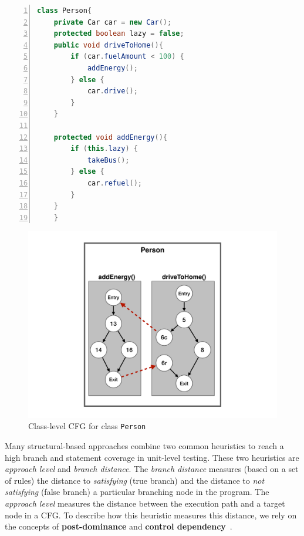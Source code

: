 \begin{lstlisting}[frame=tb,
    caption={Class \texttt{Person}},
    label=list:ClassA,
    language=java,
    captionpos=t,
    numbers=left,
    belowskip=-2.5em,
    float=t,
    firstnumber=1]
class Person{
    private Car car = new Car();
    protected boolean lazy = false;
    public void driveToHome(){
        if (car.fuelAmount < 100) {
            addEnergy();
        } else {
            car.drive();
        }   
    }

    protected void addEnergy(){
        if (this.lazy) {
            takeBus();
        } else {
            car.refuel();
        }
    }   
    }
  \end{lstlisting}

  \begin{figure}[t]
    \centering
	\includegraphics[width=0.85\linewidth]{figs/CCFG_new}
	\caption{Class-level CFG for class \texttt{Person}}
  \label{fig:CCFG}
\end{figure}


Many structural-based approaches combine two common heuristics to reach a high branch and statement coverage in unit-level testing. These two heuristics  are \textit{approach level} and \textit{branch distance}.
The \textit{branch distance} measures (based on a set of rules) the distance to \textit{satisfying} (true branch) and the distance to \textit{not satisfying} (false branch) a particular branching node in the program.
The \textit{approach level} measures the distance between the execution path and a target node in a CFG. To describe how this heuristic measures this distance, we 
rely on the concepts of \textbf{post-dominance} and \textbf{control dependency}~\cite{Allen:1970:CFA:800028.808479}. 

